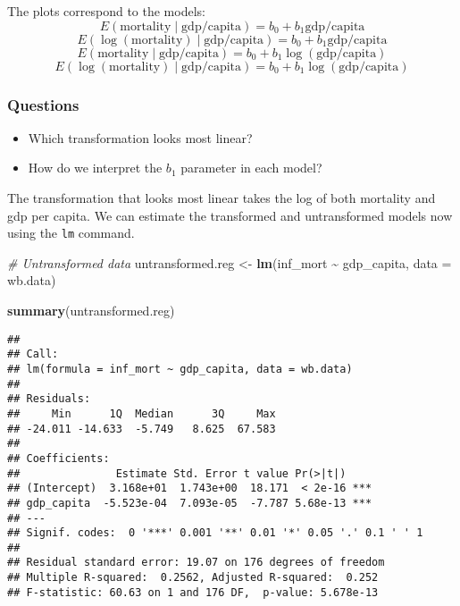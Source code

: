 \documentclass[
]{article}
\newenvironment{Shaded}{\begin{snugshade}}{\end{snugshade}}
\newcommand{\AttributeTok}[1]{\textcolor[rgb]{0.13,0.29,0.53}{#1}}
\newcommand{\CommentTok}[1]{\textcolor[rgb]{0.56,0.35,0.01}{\textit{#1}}}
\newcommand{\FunctionTok}[1]{\textcolor[rgb]{0.13,0.29,0.53}{\textbf{#1}}}
\newcommand{\NormalTok}[1]{#1}
\newcommand{\OtherTok}[1]{\textcolor[rgb]{0.56,0.35,0.01}{#1}}
\newcommand{\SpecialCharTok}[1]{\textcolor[rgb]{0.81,0.36,0.00}{\textbf{#1}}}
\providecommand{\tightlist}{%
  \setlength{\itemsep}{0pt}\setlength{\parskip}{0pt}}
\begin{document}
The plots correspond to the models:
\[E(\text{mortality} \mid \text{gdp/capita}) = b_0 + b_1\text{gdp/capita}\]
\[E(\log(\text{mortality}) \mid \text{gdp/capita}) = b_0 + b_1\text{gdp/capita}\]
\[E(\text{mortality} \mid \text{gdp/capita}) = b_0 + b_1\log(\text{gdp/capita})\]
\[E(\log(\text{mortality}) \mid \text{gdp/capita}) = b_0 + b_1\log(\text{gdp/capita})\]

\subsubsection{Questions}\label{questions-3}

\begin{itemize}
\tightlist
\item
  Which transformation looks most linear?
\item
  How do we interpret the \(b_1\) parameter in each model?
\end{itemize}

The transformation that looks most linear takes the log of both
mortality and gdp per capita. We can estimate the transformed and
untransformed models now using the \texttt{lm} command.

\begin{Shaded}
\begin{Highlighting}[]
\CommentTok{\# Untransformed data}
\NormalTok{untransformed.reg }\OtherTok{\textless{}{-}} \FunctionTok{lm}\NormalTok{(inf\_mort }\SpecialCharTok{\textasciitilde{}}\NormalTok{ gdp\_capita, }\AttributeTok{data =}\NormalTok{ wb.data)}

\FunctionTok{summary}\NormalTok{(untransformed.reg)}
\end{Highlighting}
\end{Shaded}

\begin{verbatim}
## 
## Call:
## lm(formula = inf_mort ~ gdp_capita, data = wb.data)
## 
## Residuals:
##     Min      1Q  Median      3Q     Max 
## -24.011 -14.633  -5.749   8.625  67.583 
## 
## Coefficients:
##               Estimate Std. Error t value Pr(>|t|)    
## (Intercept)  3.168e+01  1.743e+00  18.171  < 2e-16 ***
## gdp_capita  -5.523e-04  7.093e-05  -7.787 5.68e-13 ***
## ---
## Signif. codes:  0 '***' 0.001 '**' 0.01 '*' 0.05 '.' 0.1 ' ' 1
## 
## Residual standard error: 19.07 on 176 degrees of freedom
## Multiple R-squared:  0.2562, Adjusted R-squared:  0.252 
## F-statistic: 60.63 on 1 and 176 DF,  p-value: 5.678e-13
\end{verbatim}
\end{document}
